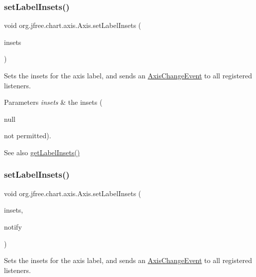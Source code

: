 \subsubsection{\texorpdfstring{set\+Label\+Insets()}{setLabelInsets()}\hspace{0.1cm}{\footnotesize\ttfamily [1/2]}}
{\footnotesize\ttfamily void org.\+jfree.\+chart.\+axis.\+Axis.\+set\+Label\+Insets (\begin{DoxyParamCaption}\item[{Rectangle\+Insets}]{insets }\end{DoxyParamCaption})}

Sets the insets for the axis label, and sends an \mbox{\hyperlink{}{Axis\+Change\+Event}} to all registered listeners.


\begin{DoxyParams}{Parameters}
{\em insets} & the insets (
\begin{DoxyCode}
null 
\end{DoxyCode}
 not permitted).\\
\hline
\end{DoxyParams}
\begin{DoxySeeAlso}{See also}
\mbox{\hyperlink{classorg_1_1jfree_1_1chart_1_1axis_1_1_axis_a8b74d954f3fe5c0cd36ce38399cccd98}{get\+Label\+Insets()}} 
\end{DoxySeeAlso}
\mbox{\label{classorg_1_1jfree_1_1chart_1_1axis_1_1_axis_aaf19ff43edd2fb4cc3512c4941ca9712}} 
\subsubsection{\texorpdfstring{set\+Label\+Insets()}{setLabelInsets()}\hspace{0.1cm}{\footnotesize\ttfamily [2/2]}}
{\footnotesize\ttfamily void org.\+jfree.\+chart.\+axis.\+Axis.\+set\+Label\+Insets (\begin{DoxyParamCaption}\item[{Rectangle\+Insets}]{insets,  }\item[{boolean}]{notify }\end{DoxyParamCaption})}

Sets the insets for the axis label, and sends an \mbox{\hyperlink{}{Axis\+Change\+Event}} to all registered listeners.



